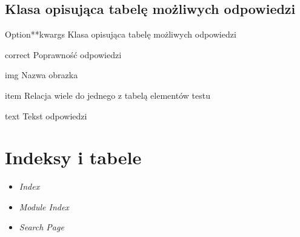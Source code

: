 \documentclass[letterpaper,10pt,polish]{manual}
\begin{document}
\section{Klasa opisująca tabelę możliwych odpowiedzi}

\hypertarget{dbmodel.Option}{}\begin{classdesc}{Option}{**kwargs}
Klasa opisująca tabelę możliwych odpowiedzi

\hypertarget{dbmodel.Option.correct}{}\begin{memberdesc}{correct}
Poprawność odpowiedzi
\end{memberdesc}

\hypertarget{dbmodel.Option.img}{}\begin{memberdesc}{img}
Nazwa obrazka
\end{memberdesc}

\hypertarget{dbmodel.Option.item}{}\begin{memberdesc}{item}
Relacja wiele do jednego z tabelą elementów testu
\end{memberdesc}

\hypertarget{dbmodel.Option.text}{}\begin{memberdesc}{text}
Tekst odpowiedzi
\end{memberdesc}
\end{classdesc}


\chapter{Indeksy i tabele}
\begin{itemize}
\item {} 
\emph{Index}

\item {} 
\emph{Module Index}

\item {} 
\emph{Search Page}

\end{itemize}


\renewcommand{\indexname}{Indeks modułów}
\printmodindex
\renewcommand{\indexname}{Indeks}
\printindex
\end{document}
